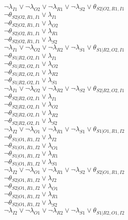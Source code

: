$\neg\lambda_{I1} \vee \neg\lambda_{O2} \vee \neg\lambda_{R1} \vee \neg\lambda_{S2} \vee \theta_{S2|O2,R1,I1}$\\
$\neg\theta_{S2|O2,R1,I1} \vee \lambda_{I1}$\\
$\neg\theta_{S2|O2,R1,I1} \vee \lambda_{O2}$\\
$\neg\theta_{S2|O2,R1,I1} \vee \lambda_{R1}$\\
$\neg\theta_{S2|O2,R1,I1} \vee \lambda_{S2}$\\
$\neg\lambda_{I1} \vee \neg\lambda_{O2} \vee \neg\lambda_{R2} \vee \neg\lambda_{S1} \vee \theta_{S1|R2,O2,I1}$\\
$\neg\theta_{S1|R2,O2,I1} \vee \lambda_{I1}$\\
$\neg\theta_{S1|R2,O2,I1} \vee \lambda_{O2}$\\
$\neg\theta_{S1|R2,O2,I1} \vee \lambda_{R2}$\\
$\neg\theta_{S1|R2,O2,I1} \vee \lambda_{S1}$\\
$\neg\lambda_{I1} \vee \neg\lambda_{O2} \vee \neg\lambda_{R2} \vee \neg\lambda_{S2} \vee \theta_{S2|R2,O2,I1}$\\
$\neg\theta_{S2|R2,O2,I1} \vee \lambda_{I1}$\\
$\neg\theta_{S2|R2,O2,I1} \vee \lambda_{O2}$\\
$\neg\theta_{S2|R2,O2,I1} \vee \lambda_{R2}$\\
$\neg\theta_{S2|R2,O2,I1} \vee \lambda_{S2}$\\
$\neg\lambda_{I2} \vee \neg\lambda_{O1} \vee \neg\lambda_{R1} \vee \neg\lambda_{S1} \vee \theta_{S1|O1,R1,I2}$\\
$\neg\theta_{S1|O1,R1,I2} \vee \lambda_{I2}$\\
$\neg\theta_{S1|O1,R1,I2} \vee \lambda_{O1}$\\
$\neg\theta_{S1|O1,R1,I2} \vee \lambda_{R1}$\\
$\neg\theta_{S1|O1,R1,I2} \vee \lambda_{S1}$\\
$\neg\lambda_{I2} \vee \neg\lambda_{O1} \vee \neg\lambda_{R1} \vee \neg\lambda_{S2} \vee \theta_{S2|O1,R1,I2}$\\
$\neg\theta_{S2|O1,R1,I2} \vee \lambda_{I2}$\\
$\neg\theta_{S2|O1,R1,I2} \vee \lambda_{O1}$\\
$\neg\theta_{S2|O1,R1,I2} \vee \lambda_{R1}$\\
$\neg\theta_{S2|O1,R1,I2} \vee \lambda_{S2}$\\
$\neg\lambda_{I2} \vee \neg\lambda_{O1} \vee \neg\lambda_{R2} \vee \neg\lambda_{S1} \vee \theta_{S1|R2,O1,I2}$\\
